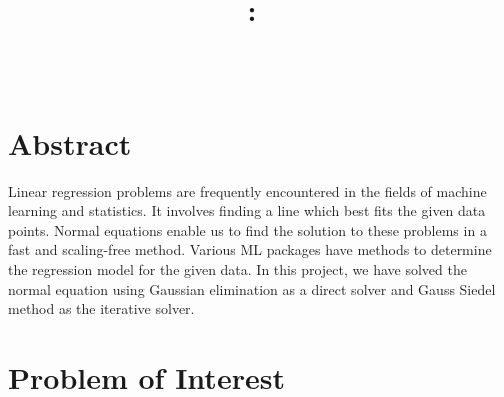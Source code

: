 \documentclass{article}
\title{\vspace{2in}\textmd{\textbf{\hmwkClass:\ \hmwkTitle}} \\
\vspace{0.1in}\large{ \hmwkClassTime}\vspace{3in}}
\author{\textbf{\hmwkAuthorName} \\ \vspace{0.1in}
\hmwkDueDate }
\date{} %
\begin{document}
\begin{spacing}{1.1}
\maketitle

\newpage
\section*{Abstract}

Linear regression problems are frequently encountered in the fields of machine learning and statistics. It involves finding a line which best fits the given data points. Normal equations enable us to find the solution to these problems in a fast and scaling-free method. Various ML packages have methods to determine the regression model for the given data. In this project, we have solved the normal equation using Gaussian elimination  as a direct solver and Gauss Siedel method as the iterative solver. 

\section{Problem of Interest}


\end{spacing}
\end{document}
